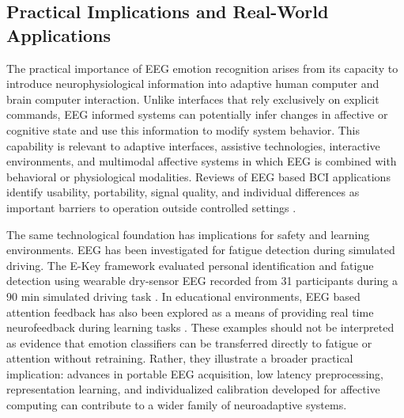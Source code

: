 \documentclass[ASNA,twocolumn]{USG}
\begin{document}
\subsection{Practical Implications and Real-World Applications}
\label{subsec:importance_practical_implications}

The practical importance of EEG emotion recognition arises from its capacity to introduce neurophysiological information into adaptive human computer and brain computer interaction. Unlike interfaces that rely exclusively on explicit commands, EEG informed systems can potentially infer changes in affective or cognitive state and use this information to modify system behavior. This capability is relevant to adaptive interfaces, assistive technologies, interactive environments, and multimodal affective systems in which EEG is combined with behavioral or physiological modalities. Reviews of EEG based BCI applications identify usability, portability, signal quality, and individual differences as important barriers to operation outside controlled settings \cite{varbu2022past}.

The same technological foundation has implications for safety and learning environments. EEG has been investigated for fatigue detection during simulated driving. The E-Key framework evaluated personal identification and fatigue detection using wearable dry-sensor EEG recorded from 31 participants during a 90 min simulated driving task \cite{xu2021key}. In educational environments, EEG based attention feedback has also been explored as a means of providing real time neurofeedback during learning tasks \cite{sethi2018eeg}. These examples should not be interpreted as evidence that emotion classifiers can be transferred directly to fatigue or attention without retraining. Rather, they illustrate a broader practical implication: advances in portable EEG acquisition, low latency preprocessing, representation learning, and individualized calibration developed for affective computing can contribute to a wider family of neuroadaptive systems.
\end{document}
